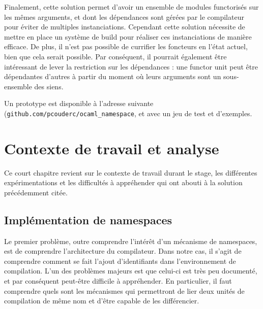 \documentclass[11pt,a4paper]{report}
\begin{document}
Finalement, cette solution permet d'avoir un ensemble de modules functorisés sur
les mêmes arguments, et dont les dépendances sont gérées par le compilateur pour
éviter de multiples instanciations. Cependant cette solution nécessite de mettre
en place un système de build pour réaliser ces instanciations de manière
efficace. De plus, il n'est pas possible de currifier les foncteurs en l'état
actuel, bien que cela serait possible. Par conséquent, il pourrait également
être intéressant de lever la restriction sur les dépendances : une functor unit
peut être dépendantes d'autres à partir du moment où leurs arguments sont un
sous-ensemble des siens.

\medskip

Un prototype est disponible à l'adresse suivante
(\texttt{github.com/pcouderc/ocaml_namespace}, et avec un jeu de test et
d'exemples.

\chapter{Contexte de travail et analyse}

Ce court chapitre revient sur le contexte de travail durant le stage, les
différentes expérimentations et les difficultés à appréhender qui ont abouti à
la solution précédemment citée.

\section{Implémentation de namespaces}

Le premier problème, outre comprendre l'intérêt d'un mécanisme de namespaces,
est de comprendre l'architecture du compilateur. Dans notre cas, il s'agit de
comprendre comment se fait l'ajout d'identifiants dans l'environnement de
compilation. L'un des problèmes majeurs est que celui-ci est très peu documenté,
et par conséquent peut-être difficile à appréhender. En particulier, il faut
comprendre quels sont les mécanismes qui permettront de lier deux unités de
compilation de même nom et d'être capable de les différencier.
\end{document}
